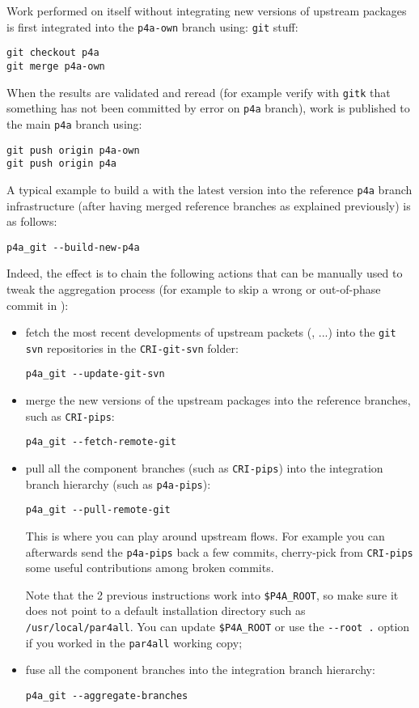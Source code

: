 \documentclass[a4paper]{article}
\begin{document}
Work performed on \Apfa itself without integrating new versions of upstream
packages is first integrated into the \texttt{p4a-own} branch using:
\texttt{git} stuff:
\begin{verbatim}
git checkout p4a
git merge p4a-own
\end{verbatim}
When the results are validated and reread (for example verify with
\texttt{gitk} that something has not been committed by error on
\texttt{p4a} branch), work is published to the main \texttt{p4a} branch
using:
\begin{verbatim}
git push origin p4a-own
git push origin p4a
\end{verbatim}

A typical example to build a \Apfa with the latest \Apips version into the
reference \verb|p4a| branch infrastructure (after having merged
reference branches as explained previously) is as follows:
\begin{verbatim}
p4a_git --build-new-p4a
\end{verbatim}

Indeed, the effect is to chain the following actions that can be manually
used to tweak the aggregation process (for example to skip a wrong or
out-of-phase commit in \Apips):
\begin{itemize}
\item fetch the most recent developments of upstream packets (\Apips,
  \Apolylib...) into the \texttt{git svn} repositories in the
  \texttt{CRI-git-svn} folder:
\begin{verbatim}
p4a_git --update-git-svn
\end{verbatim}
\item merge the new versions of the upstream packages into the \Apfa
  reference branches, such as \texttt{CRI-pips}:
\begin{verbatim}
p4a_git --fetch-remote-git
\end{verbatim}
\item pull all the component branches (such as \texttt{CRI-pips}) into the
  \Apfa integration branch hierarchy (such as \texttt{p4a-pips}):
\begin{verbatim}
p4a_git --pull-remote-git
\end{verbatim}
  This is where you can play around upstream flows. For example you can
  afterwards send the \texttt{p4a-pips} back a few commits, cherry-pick
  from \texttt{CRI-pips} some useful contributions among broken commits.

  Note that the 2 previous instructions work into \verb|$P4A_ROOT|, %
  so make sure it does not point to a default installation directory such
  as \texttt{/usr/local/par4all}. You can update \verb|$P4A_ROOT| %
  or use the \verb|--root .| option if you worked in the \texttt{par4all}
  working copy;
\item fuse all the component branches into the \Apfa integration
  branch hierarchy:
\begin{verbatim}
p4a_git --aggregate-branches
\end{verbatim}
\end{itemize}
\end{document}
